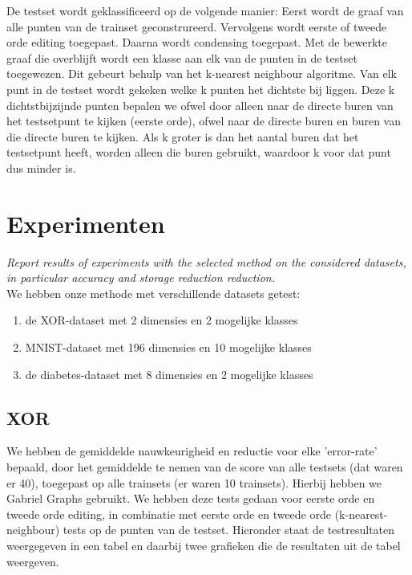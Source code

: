 \documentclass{article}
\begin{document}
De testset wordt geklassificeerd op de volgende manier: Eerst wordt de graaf van alle punten van de trainset  geconstrureerd. Vervolgens wordt eerste of tweede orde editing toegepast. Daarna wordt condensing toegepast. Met de bewerkte graaf die overblijft wordt een klasse aan elk van de punten in de testset toegewezen. Dit gebeurt behulp van het k-nearest neighbour algoritme. Van elk punt in de testset wordt gekeken welke k punten het dichtste bij liggen. Deze k dichtstbijzijnde punten bepalen we ofwel door alleen naar de directe buren van het testsetpunt te kijken (eerste orde), ofwel naar de directe buren en buren van die directe buren te kijken. Als k groter is dan het aantal buren dat het testsetpunt heeft, worden alleen die buren gebruikt, waardoor k voor dat punt dus minder is.

\section{Experimenten}
\emph{Report results of experiments with the selected method on the considered datasets, 
in particular accuracy and storage reduction reduction. }\\

We hebben onze methode met verschillende datasets getest:
\begin{enumerate}
\item de XOR-dataset met 2 dimensies en 2 mogelijke klasses
\item MNIST-dataset met 196 dimensies en 10 mogelijke klasses
\item de diabetes-dataset met 8 dimensies en 2 mogelijke klasses
\end{enumerate}

\subsection{XOR}
We hebben de gemiddelde nauwkeurigheid en reductie voor elke 'error-rate' bepaald, door het gemiddelde te nemen van de score van alle testsets (dat waren er 40), toegepast op alle trainsets (er waren 10 trainsets). Hierbij hebben we Gabriel Graphs gebruikt. We hebben deze tests gedaan voor eerste orde en tweede orde editing, in combinatie met eerste orde en tweede orde (k-nearest-neighbour) tests op de punten van de testset. Hieronder staat de testresultaten weergegeven in een tabel en daarbij twee grafieken die de resultaten uit de tabel weergeven. \\
\end{document}
